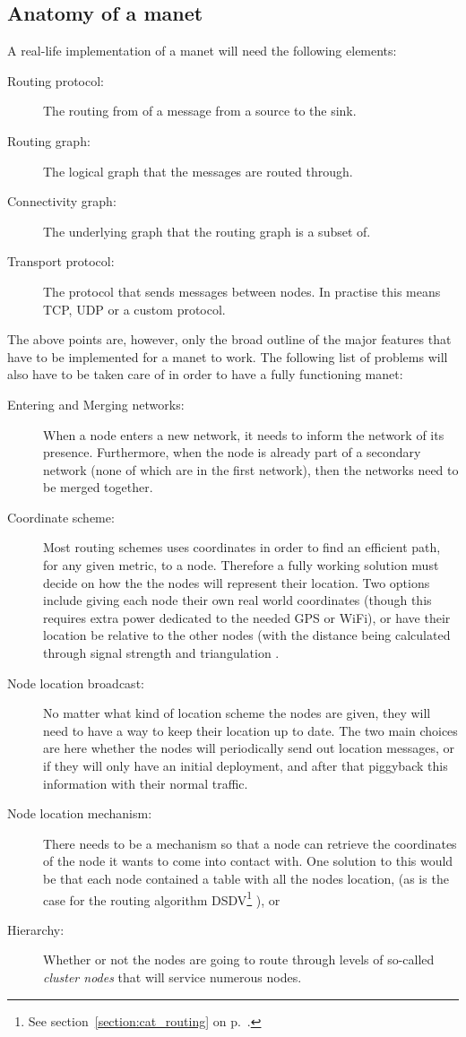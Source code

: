 \subsection{Anatomy of a \ac{manet}}
A real-life implementation of a \ac{manet} will need the following elements:
\begin{description}
\item[Routing protocol:] The routing from of a message from a source to the sink.
\item[Routing graph:] The logical graph that the messages are routed through.
\item[Connectivity graph:] The underlying graph that the routing graph is a subset of.
\item[Transport protocol:] The protocol that sends messages between nodes. In practise this means TCP, UDP or a custom protocol.
\end{description}

The above points are, however, only the broad outline of the major features that have to be implemented for a \ac{manet} to work. The following list of problems will also have to be taken care of in order to have a fully functioning \ac{manet}:

\begin{description}
\item[Entering and Merging networks:] When a node enters a new network, it needs to inform the network of its presence. Furthermore, when the node is already part of a secondary network (none of which are in the first network), then the networks need to be merged together.  
\item[Coordinate scheme:] Most routing schemes uses coordinates in order to find an efficient path, for any given metric, to a node. Therefore a fully working solution must decide on how the the nodes will represent their location. Two options include giving each node their own real world coordinates (though this requires extra power dedicated to the needed GPS or WiFi), or have their location be relative to the other nodes (with the distance being calculated through signal strength and triangulation \cite{geoNoInfo}.
\item[Node location broadcast:] No matter what kind of location scheme the nodes are given, they will need to have a way to keep their location up to date. The two main choices are here whether the nodes will periodically send out location messages, or if they will only have an initial deployment, and after that piggyback this information with their normal traffic.
\item[Node location mechanism:] There needs to be a mechanism so that a node can retrieve the coordinates of the node it wants to come into contact with. One solution to this would be that each node contained a table with all the nodes location, (as is the case for the routing algorithm DSDV\footnote{See section~\ref{section:cat_routing} on p.~\pageref{section:cat_routing}.} \cite{DSDV}), or 
\item[Hierarchy:] Whether or not the nodes are going to route through levels of so-called \emph{cluster nodes} that will service numerous nodes.
\end{description} 

